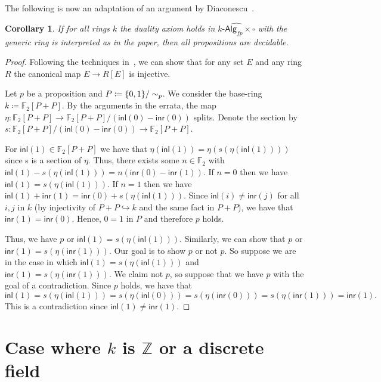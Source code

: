 \documentclass[10pt,a4paper]{article}
\newtheorem{corollary}{Corollary}[section]
\newcommand{\ints}{\mathbb{Z}}
\newcommand{\Alg}{\mathsf{Alg}}
\newcommand\inl{\mathsf{inl}}
\newcommand\inr{\mathsf{inr}}
\DeclarePairedDelimiter\set{\{}{\}}
\begin{document}
The following is now an adaptation of an argument by Diaconescu~\cite{diaconescu1975choice}.

\begin{corollary}
  If for all rings \(k\) the duality axiom holds in $\widehat{k\text{-}\Alg_{fp} \times \square}$ with the generic ring is interpreted as in the paper, then all propositions are decidable.
\end{corollary}
\begin{proof}
  Following the techniques in~\cite{mines}, we can show that for any set $E$ and any ring $R$ the canonical map $E \to R[E]$ is injective.

  Let $p$ be a proposition and $P \coloneqq \set{0,1} / \sim_p$.
  We consider the base-ring $k \coloneqq \mathbb{F}_2[P + P]$.
  By the arguments in the errata, the map $\eta \colon \mathbb{F}_2[P + P] \to \mathbb{F}_2[P + P] / (\inl(0) - \inr(0))$ splits.
  Denote the section by $s : \mathbb{F}_2[P + P] / (\inl(0) - \inr(0)) \to \mathbb{F}_2[P + P]$.

  For $\inl(1) \in \mathbb{F}_2[P + P]$ we have that $\eta(\inl(1)) = \eta(s(\eta(\inl(1))))$ since s is a section of $\eta$.
  Thus, there exists some $n \in \mathbb{F}_2$ with $\inl(1) - s(\eta(\inl(1))) = n(\inr(0) - \inr(1))$.
  If $n = 0$ then we have $\inl(1) = s(\eta(\inl(1)))$.
  If $n = 1$ then we have $\inl(1) + \inr(1) = \inr(0) + s(\eta(\inl(1)))$.
  Since $\inl(i) \ne \inr(j)$ for all $i, j$ in $k$ (by injectivity of $P + P \hookrightarrow k$ and the same fact in $P + P$), we have that $\inr(1) = \inr(0)$.
  Hence, $0 = 1$ in $P$ and therefore $p$ holds.

  Thus, we have $p$ or $\inl(1) = s(\eta(\inl(1)))$.
  Similarly, we can show that $p$ or $\inr(1) = s(\eta(\inr(1)))$.
  Our goal is to show $p$ or not $p$.
  So suppose we are in the case in which $\inl(1) = s(\eta(\inl(1)))$ and $\inr(1) = s(\eta(\inr(1)))$.
  We claim not $p$, so suppose that we have $p$ with the goal of a contradiction.
  Since $p$ holds, we have that
  \[
    \inl(1) = s(\eta(\inl(1))) = s(\eta(\inl(0))) = s(\eta(\inr(0))) = s(\eta(\inr(1))) = \inr(1).
  \]
  This is a contradiction since $\inl(1) \ne \inr(1)$.
\end{proof}


\section{Case where \texorpdfstring{$k$}{k} is \texorpdfstring{$\ints$}{ℤ} or a discrete field}
\end{document}
